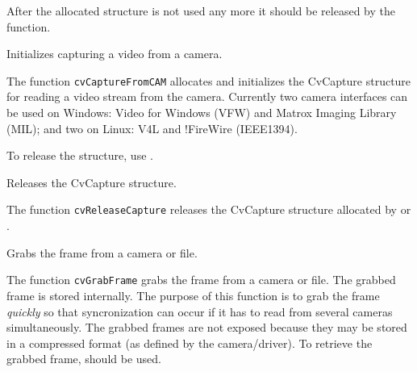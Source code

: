 After the allocated structure is not used any more it should be released by the  function.


Initializes capturing a video from a camera.


\begin{description}
\end{description}

The function \texttt{cvCaptureFromCAM} allocates and initializes the CvCapture structure for reading a video stream from the camera. Currently two camera interfaces can be used on Windows: Video for Windows (VFW) and Matrox Imaging Library (MIL); and two on Linux: V4L and !FireWire (IEEE1394).

To release the structure, use .


Releases the CvCapture structure.


\begin{description}
\end{description}

The function \texttt{cvReleaseCapture} releases the CvCapture structure allocated by  or .


Grabs the frame from a camera or file.


\begin{description}
\end{description}

The function \texttt{cvGrabFrame} grabs the frame from a camera or file. The grabbed frame is stored internally. The purpose of this function is to grab the frame \emph{quickly} so that syncronization can occur if it has to read from several cameras simultaneously. The grabbed frames are not exposed because they may be stored in a compressed format (as defined by the camera/driver). To retrieve the grabbed frame,  should be used.


